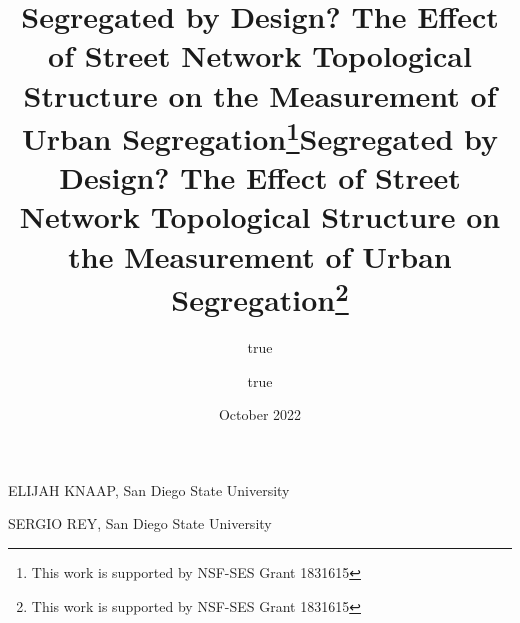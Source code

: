 \documentclass[
  10pt,
]{article}
\title{Segregated by Design? The Effect of Street Network Topological
Structure on the Measurement of Urban Segregation\thanks{This work is
supported by NSF-SES Grant 1831615}}
\author{true \and true}
\date{October 2022}
\title{Segregated by Design? The Effect of Street Network Topological
Structure on the Measurement of Urban Segregation\thanks{This work is
supported by NSF-SES Grant 1831615}  }
\date{}
\begin{document}



{%
\setlength{\parindent}{0pt}
\thispagestyle{plain}
{%
\maketitle  %

}




{
   \vskip 13.5pt\relax \normalsize\fontsize{11}{12} 
   \MakeUppercase{\textsf{\large Elijah Knaap}}, \small{San Diego State
University}   \par \MakeUppercase{\textsf{\large Sergio
Rey}}, \small{San Diego State University}   

}

}
\end{document}
